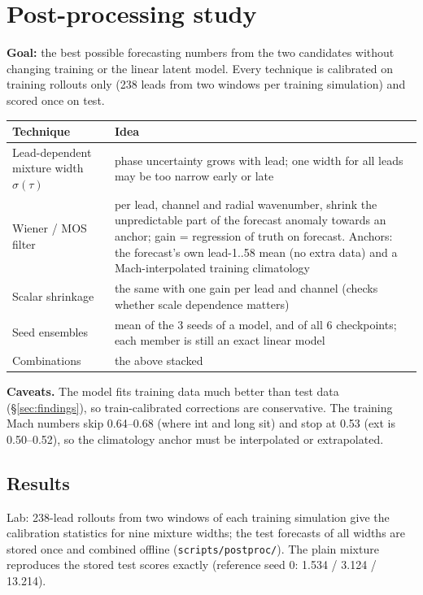 \documentclass[10.5pt,a4paper]{article}
\begin{document}
\section{Post-processing study}\label{sec:pp}

\textbf{Goal:} the best possible forecasting numbers from the two candidates without changing
training or the linear latent model. Every technique is calibrated on training rollouts only
(238 leads from two windows per training simulation) and scored once on test.

\begin{center}\small
\begin{tabularx}{\linewidth}{lY}
\toprule
Technique & Idea\\
\midrule
Lead-dependent mixture width $\sigma(\tau)$ & phase uncertainty grows with lead; one width
  for all leads may be too narrow early or late\\
Wiener / MOS filter & per lead, channel and radial wavenumber, shrink the unpredictable part of
  the forecast anomaly towards an anchor; gain = regression of truth on forecast. Anchors: the
  forecast's own lead-1..58 mean (no extra data) and a Mach-interpolated training climatology\\
Scalar shrinkage & the same with one gain per lead and channel (checks whether scale dependence matters)\\
Seed ensembles & mean of the 3 seeds of a model, and of all 6 checkpoints; each member is still
  an exact linear model\\
Combinations & the above stacked\\
\bottomrule
\end{tabularx}
\end{center}

\textbf{Caveats.} The model fits training data much better than test data (\S\ref{sec:findings}),
so train-calibrated corrections are conservative. The training Mach numbers skip 0.64--0.68
(where int and long sit) and stop at 0.53 (ext is 0.50--0.52), so the climatology anchor must be
interpolated or extrapolated.

\subsection{Results}

Lab: 238-lead rollouts from two windows of each training simulation give the calibration
statistics for nine mixture widths; the test forecasts of all widths are stored once and
combined offline (\texttt{scripts/postproc/}). The plain mixture reproduces the stored test
scores exactly (reference seed 0: 1.534 / 3.124 / 13.214).
\end{document}
